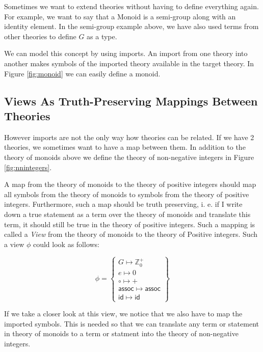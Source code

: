 Sometimes we want to extend theories without having to define everything again. For example, we want to say that a Monoid is a semi-group along with an identity element. In the semi-group example above, we have also used terms from other theories to define $G$ as a type.

We can model this concept by using imports. An import from one theory into another makes symbols of the imported theory available in the target theory. In Figure \ref{fig:monoid} we can easily define a monoid.



\subsection{Views As Truth-Preserving Mappings Between Theories}

However imports are not the only way how theories can be related. If we have 2 theories, we sometimes want to have a map between them. In addition to the theory of monoids above we define the theory of non-negative integers in Figure \ref{fig:nnintegers}.



A map from the theory of monoids to the theory of positive integers should map all symbols from the theory of monoids to symbols from the theory of positive integers. Furthermore, such a map should be truth preserving, i. e. if I write down a true statement as a term over the theory of monoids and translate this term, it should still be true  in the theory of positive integers. Such a mapping is called a \textit{View} from the theory of monoids to the theory of Positive integers. Such a view $\phi$ could look as follows:

\[
  \phi=\left\{\begin{array}{l}
  G \mapsto \mathbb{Z}^{+}_{0}\\
  e \mapsto 0\\
  \circ \mapsto +\\
  \mathsf{assoc} \mapsto \mathsf{assoc}\\
  \mathsf{id} \mapsto \mathsf{id}
  \end{array}\right\}
\]

If we take a closer look at this view, we notice that we also have to map the imported symbols. This is needed so that we can translate any term or statement in theory of monoids to a term or statment into the theory of non-negative integers.

